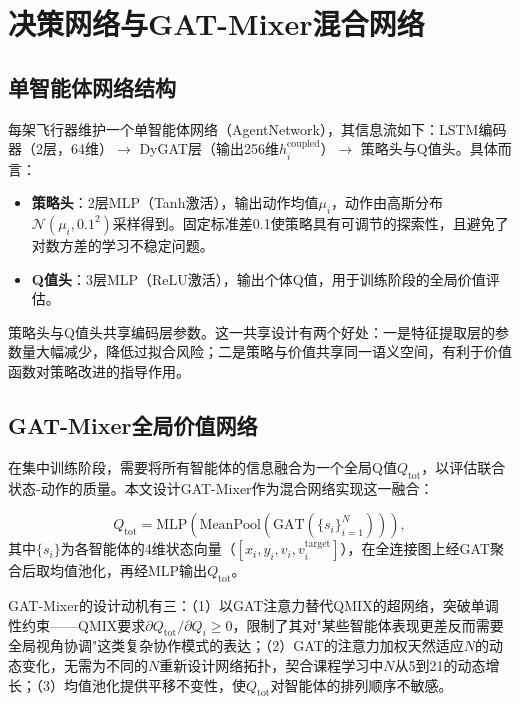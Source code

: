 \documentclass[12pt,a4paper,UTF8]{ctexbook}
\begin{document}
\section{决策网络与GAT-Mixer混合网络}

\subsection{单智能体网络结构}

每架飞行器维护一个单智能体网络（AgentNetwork），其信息流如下：LSTM编码器（2层，64维）$\to$ DyGAT层（输出256维$h_i^{\text{coupled}}$）$\to$ 策略头与Q值头。具体而言：
\begin{itemize}
    \item \textbf{策略头}：2层MLP（Tanh激活），输出动作均值$\mu_i$，动作由高斯分布$\mathcal{N}(\mu_i, 0.1^2)$采样得到。固定标准差0.1使策略具有可调节的探索性，且避免了对数方差的学习不稳定问题。
    \item \textbf{Q值头}：3层MLP（ReLU激活），输出个体Q值，用于训练阶段的全局价值评估。
\end{itemize}

策略头与Q值头共享编码层参数。这一共享设计有两个好处：一是特征提取层的参数量大幅减少，降低过拟合风险；二是策略与价值共享同一语义空间，有利于价值函数对策略改进的指导作用。

\subsection{GAT-Mixer全局价值网络}

在集中训练阶段，需要将所有智能体的信息融合为一个全局Q值$Q_{\text{tot}}$，以评估联合状态-动作的质量。本文设计GAT-Mixer作为混合网络实现这一融合：

\begin{equation}
    Q_{\text{tot}} = \text{MLP}\!\left(\text{MeanPool}\!\left(\text{GAT}\left(\{s_i\}_{i=1}^{N}\right)\right)\right),
    \label{eq:gat_mixer}
\end{equation}
其中$\{s_i\}$为各智能体的4维状态向量（$[x_i,y_i,v_i,v_i^{\text{target}}]$），在全连接图上经GAT聚合后取均值池化，再经MLP输出$Q_{\text{tot}}$。

GAT-Mixer的设计动机有三：（1）以GAT注意力替代QMIX的超网络，突破单调性约束——QMIX要求$\partial Q_{\text{tot}}/\partial Q_i\geq0$，限制了其对"某些智能体表现更差反而需要全局视角协调"这类复杂协作模式的表达；（2）GAT的注意力加权天然适应$N$的动态变化，无需为不同的$N$重新设计网络拓扑，契合课程学习中$N$从5到21的动态增长；（3）均值池化提供平移不变性，使$Q_{\text{tot}}$对智能体的排列顺序不敏感。
\end{document}

